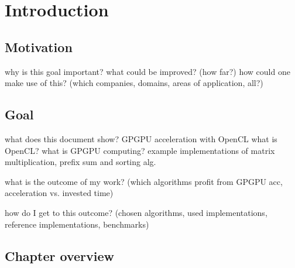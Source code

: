 \section{Introduction}


\subsection{Motivation}
why is this goal important?
what could be improved? (how far?)
how could one make use of this? (which companies, domains, areas of application, all?)

\subsection{Goal}
what does this document show?
GPGPU acceleration with OpenCL
what is OpenCL? what is GPGPU computing?
example implementations of matrix multiplication, prefix sum and sorting alg.

what is the outcome of my work? (which algorithms profit from GPGPU acc, acceleration vs. invested time)


how do I get to this outcome? (chosen algorithms, used implementations, reference implementations, benchmarks)

\subsection{Chapter overview}


